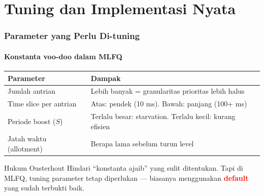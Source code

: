 \documentclass[t,aspectratio=169,xcolor=dvipsnames]{beamer}
\newcommand{\tem}[1]{\textbf{\textcolor{red}{#1}}}
\begin{document}
\section{Tuning dan Implementasi Nyata}

\begin{frame}
    \frametitle{Parameter yang Perlu Di-tuning}
    \framesubtitle{Konstanta voo-doo dalam MLFQ}
    \small
    \begin{tabular}{|p{}|p{}|}
        \hline
        \textbf{Parameter} & \textbf{Dampak} \\
        \hline
        Jumlah antrian & Lebih banyak = granularitas prioritas lebih halus \\
        \hline
        Time slice per antrian & Atas: pendek (10 ms). Bawah: panjang (100+ ms) \\
        \hline
        Periode boost ($S$) & Terlalu besar: starvation. Terlalu kecil: kurang efisien \\
        \hline
        Jatah waktu (allotment) & Berapa lama sebelum turun level \\
        \hline
    \end{tabular}

    \vspace{0.2cm}
    \begin{alertblock}{Hukum Ousterhout}
        Hindari ``konstanta ajaib'' yang sulit ditentukan. Tapi di MLFQ, tuning parameter tetap diperlukan --- biasanya menggunakan \tem{default} yang sudah terbukti baik.
    \end{alertblock}
\end{frame}
\end{document}
